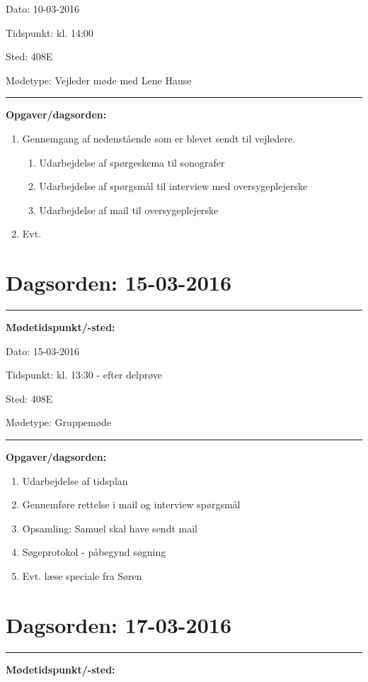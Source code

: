 Dato: \tabto{7em} 10-03-2016

Tidspunkt: \tabto{7em} kl. 14:00

Sted: \tabto{7em} 408E

Mødetype: \tabto{7em} Vejleder møde med Lene Hause \newline


\hrule
\textbf{Opgaver/dagsorden:} \newline
\begin{enumerate}
	\item Gennemgang af nedenstående som er blevet sendt til vejledere.
	\begin{enumerate}
		\item Udarbejdelse af spørgeskema til sonografer
		\item Udarbejdelse af spørgsmål til  interview med oversygeplejerske
		\item Udarbejdelse af mail  til oversygeplejerske 
	\end{enumerate} 
	\item Evt. 
\end{enumerate}


\section{Dagsorden: 15-03-2016 }
\hrule
\textbf{Mødetidspunkt/-sted:} 

Dato: \tabto{7em} 15-03-2016

Tidspunkt: \tabto{7em} kl. 13:30 - efter delprøve

Sted: \tabto{7em} 408E

Mødetype: \tabto{7em} Gruppemøde \newline


\hrule
\textbf{Opgaver/dagsorden:} \newline
\begin{enumerate}
	\item Udarbejdelse af tidsplan 
	\item Gennemføre rettelse i mail og interview spørgsmål
	\item Opsamling:  Samuel skal have sendt mail
	\item Søgeprotokol - påbegynd søgning  
	\item Evt. læse speciale fra Søren
\end{enumerate}

\newpage
\section{Dagsorden: 17-03-2016 }
\hrule
\textbf{Mødetidspunkt/-sted:} 

